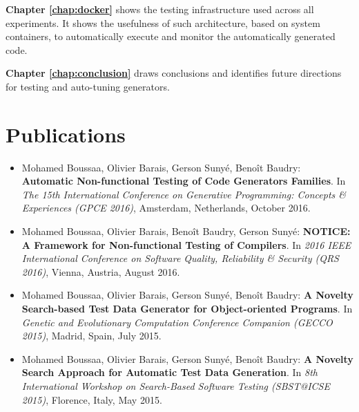 \textbf{Chapter \ref{chap:docker}} shows the testing infrastructure used across all experiments. It shows the usefulness of such architecture, based on system containers, to automatically execute and monitor the automatically generated code. 

\textbf{Chapter \ref{chap:conclusion}} draws conclusions and identifies future directions for testing and auto-tuning generators.
\newpage
\section{Publications}

\begin{itemize}
	
	\item Mohamed Boussaa, Olivier Barais, Gerson Suny\'e, Beno\^it Baudry:
	\textbf{Automatic Non-functional Testing of Code Generators Families}. In
	\textit{The 15th International Conference on Generative Programming: Concepts \& Experiences (GPCE 2016)},
	Amsterdam, Netherlands, October 2016.

	\item Mohamed Boussaa, Olivier Barais, Beno\^it Baudry, Gerson Suny\'e:
	\textbf{NOTICE: A Framework for Non-functional Testing of Compilers}. In 
	\textit{2016 IEEE International Conference on Software Quality, Reliability \& Security (QRS 2016)}, Vienna, Austria, August 2016.
	
	\item Mohamed Boussaa, Olivier Barais, Gerson Suny\'e, Beno\^it Baudry:
	\textbf{A Novelty Search-based Test Data Generator for Object-oriented Programs}. In 
	\textit{Genetic and Evolutionary Computation Conference Companion (GECCO 2015)}, 
	Madrid, Spain, July 2015.
	
	\item Mohamed Boussaa, Olivier Barais, Gerson Suny\'e, Beno\^it Baudry:
	\textbf{A Novelty Search Approach for Automatic Test Data Generation}. In
	\textit{8th International Workshop on Search-Based Software Testing (SBST@ICSE 2015)}, 
	Florence, Italy, May 2015.

	
	
\end{itemize}


